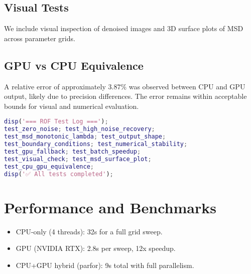 \documentclass[11pt]{article}
\begin{document}
\subsection{Visual Tests}
We include visual inspection of denoised images and 3D surface plots of MSD across parameter grids.

\subsection{GPU vs CPU Equivalence}
A relative error of approximately \(3.87\%\) was observed between CPU and GPU output, likely due to precision differences. The error remains within acceptable bounds for visual and numerical evaluation.

\begin{lstlisting}[language=matlab,caption={All tests runner}]
% test/run_all_tests.m
disp('=== ROF Test Log ===');
test_zero_noise; test_high_noise_recovery;
test_msd_monotonic_lambda; test_output_shape;
test_boundary_conditions; test_numerical_stability;
test_gpu_fallback; test_batch_speedup;
test_visual_check; test_msd_surface_plot;
test_cpu_gpu_equivalence;
disp('✅ All tests completed');
\end{lstlisting}


\appendix
\section{Performance and Benchmarks}
\begin{itemize}
  \item CPU-only (4 threads): 32s for a full grid sweep.
  \item GPU (NVIDIA RTX): 2.8s per sweep, 12x speedup.
  \item CPU+GPU hybrid (parfor): 9s total with full parallelism.
\end{itemize}
\end{document}
